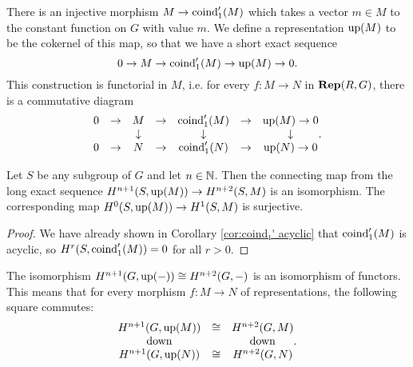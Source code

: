 \begin{definition} \label{def:up}
	There is an injective morphism $M \to \mathrm{coind}_1'(M)$ which takes a vector $m \in M$
	to the constant function on $G$ with value $m$.
	We define a representation $\mathrm{up}(M)$ to be the cokernel of this map, so that we have a short exact
	sequence
	\[
		0 \to M \to \mathrm{coind}_1'(M) \to \mathrm{up}(M) \to 0.
	\]
	This construction is functorial in $M$, i.e. for every $f : M \to N$ in $\mathbf{Rep}(R,G)$,
	there is a commutative diagram
	\[
		\begin{matrix}
			0 & \to& M & \to & \mathrm{coind}_1'(M) & \to& \mathrm{up}(M) \to 0 \\
			&&\downarrow &&\downarrow&&\downarrow \\
			0 & \to& N & \to & \mathrm{coind}_1'(N) & \to& \mathrm{up}(N) \to 0 \\
		\end{matrix}.
	\]
\end{definition}

\begin{corollary}	\label{cor:up iso}
	\leanok
	Let $S$ be any subgroup of $G$ and let $n \in {\mathbb N}$.
	Then the connecting map from the long exact sequence $H^{n+1}(S,\mathrm{up}(M)) \to H^{n+2}(S,M)$ is an
	isomorphism.
	The corresponding map $H^{0}(S,\mathrm{up}(M)) \to H^{1}(S,M)$ is	surjective.
\end{corollary}

\begin{proof}
	We have already shown in Corollary \ref{cor:coind₁' acyclic}
	that $\mathrm{coind}_1'(M)$ is acyclic, so $H^{r}(S,\mathrm{coind}_1'(M))=0$
	for all $r>0$.
\end{proof}

\begin{lemma}	\label{lem:up iso natural}
	\leanok
	The isomorphism $H^{n+1}(G,\mathrm{up}(-)) \cong H^{n+2}(G,-)$ is an isomorphism of functors.
	This means that for every morphism $f : M \to N$ of representations, the following square commutes:
	\[
		\begin{matrix}
			H^{n+1}(G,\mathrm{up}(M)) & \cong & H^{n+2}(G,M) \\
			\mathrm{down} && \mathrm{down} \\
			H^{n+1}(G,\mathrm{up}(N)) & \cong & H^{n+2}(G,N)
		\end{matrix}.
	\]
\end{lemma}

